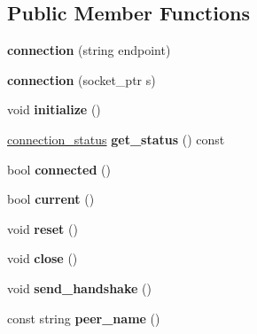 \subsection*{Public Member Functions}
\begin{DoxyCompactItemize}
\item 
\mbox{\label{classaacio_1_1connection_ae42a16cddf16de0e53452b8f0bc5ade4}} 
{\bfseries connection} (string endpoint)
\item 
\mbox{\label{classaacio_1_1connection_a53705fa0f7037007b6103ebd42be0b22}} 
{\bfseries connection} (socket\+\_\+ptr s)
\item 
\mbox{\label{classaacio_1_1connection_aed84da6702cdb8d1d6c26a80e0f4a22c}} 
void {\bfseries initialize} ()
\item 
\mbox{\label{classaacio_1_1connection_a06c4242b2eeaeccb1afbbc7805114e28}} 
\mbox{\hyperlink{structaacio_1_1connection__status}{connection\+\_\+status}} {\bfseries get\+\_\+status} () const
\item 
\mbox{\label{classaacio_1_1connection_a0277cace5b59902672edb176a3ab091d}} 
bool {\bfseries connected} ()
\item 
\mbox{\label{classaacio_1_1connection_a9f70a0fb5045832b844117ed5a229471}} 
bool {\bfseries current} ()
\item 
\mbox{\label{classaacio_1_1connection_a72e946611d648b9b4271dd2233131e37}} 
void {\bfseries reset} ()
\item 
\mbox{\label{classaacio_1_1connection_ab8a26d400d77bdf11918cf7b583bd5c6}} 
void {\bfseries close} ()
\item 
\mbox{\label{classaacio_1_1connection_a12b1e6638fcdab932fab64f61b2e3c0d}} 
void {\bfseries send\+\_\+handshake} ()
\item 
\mbox{\label{classaacio_1_1connection_a58b182a3d8f88d5847879f0ace94aaa8}} 
const string {\bfseries peer\+\_\+name} ()

\end{DoxyCompactItemize}

